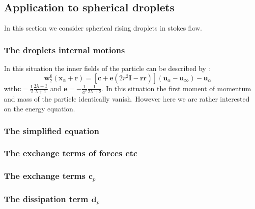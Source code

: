 
\subsection{Application to spherical droplets}
In this section we consider spherical rising droplets in stokes flow.

\subsubsection*{The droplets internal motions}
In this situation the inner fields of the particle can be described by :
\begin{equation}
    \textbf{w}_2^0(\textbf{x}_\alpha + \textbf{r}) = 
    \left[
        \textbf{c}
        +
        \textbf{e}(2r^2\textbf{I}
        - \textbf{rr})
    \right]
    (\textbf{u}_\alpha - \textbf{u}_\infty) 
    - \textbf{u}_\alpha
\end{equation}
with$ \textbf{c}= \frac{1}{2}\frac{2\lambda +3}{\lambda +1}$ and $\textbf{e} = -\frac{1}{a^2}
\frac{1}{2\lambda+2}$. 
In this situation the first moment of momentum and mass of the particle identically vanish. 
However here we are rather interested on the energy equation. 

\subsubsection*{The simplified equation }
\subsubsection*{The exchange terms of forces etc }
\subsubsection*{The exchange terms $\textbf{c}_p$}
\subsubsection*{The dissipation term $\textbf{d}_p$}

